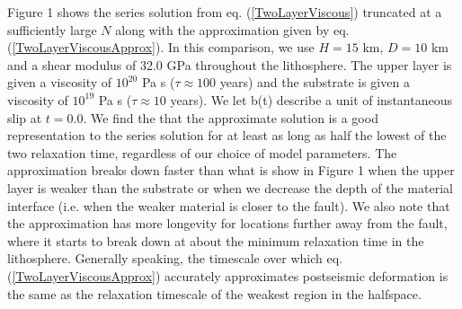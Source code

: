 \documentclass[extra,mreferee]{gji}
\begin{document}
Figure 1 shows the series solution from eq. (\ref{TwoLayerViscous})
truncated at a sufficiently large $N$ along with the approximation
given by eq. (\ref{TwoLayerViscousApprox}). In this comparison, we use
$H=15$ km, $D=10$ km and a shear modulus of 32.0 GPa throughout the
lithosphere.  The upper layer is given a viscosity of $10^{20}$ Pa s
($\tau\approx 100$ years) and the substrate is given a viscosity of
$10^{19}$ Pa s ($\tau\approx 10$ years).  We let b(t) describe a unit
of instantaneous slip at $t=0.0$.  We find the that the approximate
solution is a good representation to the series solution for at least
as long as half the lowest of the two relaxation time, regardless of
our choice of model parameters.  The approximation breaks down faster
than what is show in Figure 1 when the upper layer is weaker than the
substrate or when we decrease the depth of the material interface
(i.e. when the weaker material is closer to the fault).  We also note
that the approximation has more longevity for locations further away
from the fault, where it starts to break down at about the minimum
relaxation time in the lithosphere.  Generally speaking, the timescale
over which eq. (\ref{TwoLayerViscousApprox}) accurately approximates
postseismic deformation is the same as the relaxation timescale of the
weakest region in the halfspace.
\end{document}
